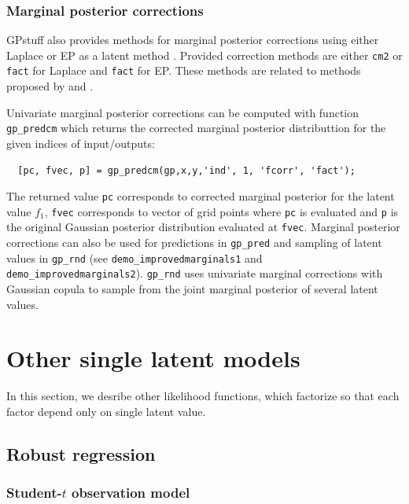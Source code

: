 \documentclass[twoside,11pt]{article}
\newcommand{\pkg}[1]{{\fontseries{b}\selectfont #1}}
\begin{document}
\subsubsection{Marginal posterior corrections}

\pkg{GPstuff} also provides methods for marginal posterior corrections using either Laplace or EP as a latent method \citep{Cseke+Heskes:2011}. Provided correction methods are either \texttt{cm2} or \texttt{fact} for Laplace and \texttt{fact} for EP. These methods are related to methods proposed by \citet{Tierney+Kadane:1986} and \citet{Rue+Martino+Chopin:2009}.

Univariate marginal posterior corrections can be computed with function \texttt{gp\_predcm} which returns the corrected marginal posterior distributtion for the given indices of input/outputs:
\begin{verbatim}
  [pc, fvec, p] = gp_predcm(gp,x,y,'ind', 1, 'fcorr', 'fact');
\end{verbatim}
The returned value \texttt{pc} corresponds to corrected marginal posterior for the latent value $f_1$, \texttt{fvec} corresponds to vector of grid points where \texttt{pc} is evaluated and \texttt{p} is the original Gaussian posterior distribution evaluated at \texttt{fvec}. Marginal posterior corrections can also be used for predictions in \texttt{gp\_pred} and sampling of latent values in \texttt{gp\_rnd} (see \texttt{demo\_improvedmarginals1} and \texttt{demo\_improvedmarginals2}). \texttt{gp\_rnd} uses univariate marginal corrections with Gaussian copula to sample from the joint marginal posterior of several latent values.

\section{Other single latent models}


In this section, we desribe other likelihood functions, which
factorize so that each factor depend only on single latent value.
 
\subsection{Robust regression}

\subsubsection{Student-$t$ observation model}
\end{document}
